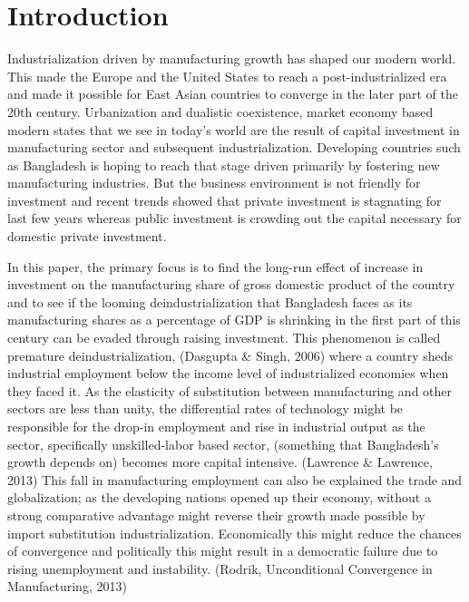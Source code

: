 \documentclass[11pt,a4paper]{article}
\begin{document}
\tableofcontents
\thispagestyle{empty} %
\clearpage %
\setcounter{page}{1} %



\section{Introduction}

\normalsize Industrialization driven by manufacturing growth has shaped our modern world. This made the Europe and the United States to reach a post-industrialized era and made it possible for East Asian countries to converge in the later part of the 20th century. Urbanization and dualistic coexistence, market economy based modern states that we see in today's world are the result of capital investment in manufacturing sector and subsequent industrialization. Developing countries such as Bangladesh is hoping to reach that stage driven primarily by fostering new manufacturing industries. But the business environment is not friendly for investment and recent trends showed that private investment is stagnating for last few years whereas public investment is crowding out the capital necessary for domestic private investment.

In this paper, the primary focus is to find the long-run effect of increase in investment on the manufacturing share of gross domestic product of the country and to see if the looming deindustrialization that Bangladesh faces as its manufacturing shares as a percentage of GDP is shrinking in the first part of this century can be evaded through raising investment. This phenomenon is called premature deindustrialization, (Dasgupta \& Singh, 2006) where a country sheds industrial employment below the income level of industrialized economies when they faced it. As the elasticity of substitution between manufacturing and other sectors are less than unity, the differential rates of technology might be responsible for the drop-in employment and rise in industrial output as the sector, specifically unskilled-labor based sector, (something that Bangladesh’s growth depends on) becomes more capital intensive. (Lawrence \& Lawrence, 2013) This fall in manufacturing employment can also be explained the trade and globalization; as the developing nations opened up their economy, without a strong comparative advantage might reverse their growth made possible by import substitution industrialization. Economically this might reduce the chances of convergence and politically this might result in a democratic failure due to rising unemployment and instability. (Rodrik, Unconditional Convergence in Manufacturing, 2013)
\end{document}
